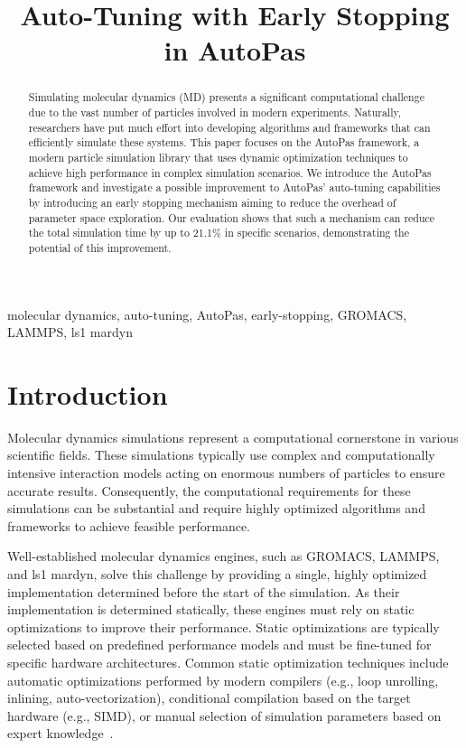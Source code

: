 \documentclass[conference]{IEEEtran}
\begin{document}
\title{Auto-Tuning with Early Stopping in AutoPas}

\author{
}

\maketitle

\begin{abstract}
    Simulating molecular dynamics (MD) presents a significant computational challenge due to the vast number of particles involved in modern experiments. Naturally, researchers have put much effort into developing algorithms and frameworks that can efficiently simulate these systems. This paper focuses on the AutoPas framework, a modern particle simulation library that uses dynamic optimization techniques to achieve high performance in complex simulation scenarios. We introduce the AutoPas framework and investigate a possible improvement to AutoPas' auto-tuning capabilities by introducing an early stopping mechanism aiming to reduce the overhead of parameter space exploration. Our evaluation shows that such a mechanism can reduce the total simulation time by up to 21.1\% in specific scenarios, demonstrating the potential of this improvement.
\end{abstract}

\begin{IEEEkeywords}
    molecular dynamics, auto-tuning, AutoPas, early-stopping, GROMACS, LAMMPS, ls1 mardyn
\end{IEEEkeywords}

\section{Introduction}

Molecular dynamics simulations represent a computational cornerstone in various scientific fields. These simulations typically use complex and computationally intensive interaction models acting on enormous numbers of particles to ensure accurate results. Consequently, the computational requirements for these simulations can be substantial and require highly optimized algorithms and frameworks to achieve feasible performance.

Well-established molecular dynamics engines, such as GROMACS, LAMMPS, and ls1 mardyn, solve this challenge by providing a single, highly optimized implementation determined before the start of the simulation. As their implementation is determined statically, these engines must rely on static optimizations to improve their performance. Static optimizations are typically selected based on predefined performance models and must be fine-tuned for specific hardware architectures. Common static optimization techniques include automatic optimizations performed by modern compilers (e.g., loop unrolling, inlining, auto-vectorization), conditional compilation based on the target hardware (e.g., SIMD), or manual selection of simulation parameters based on expert knowledge~\cite{Gratl2019AutoPas}.
\end{document}
